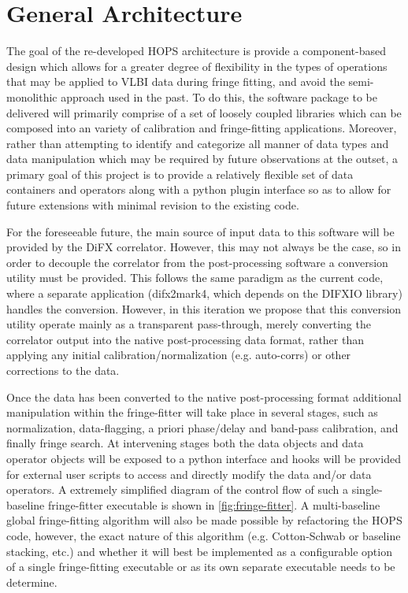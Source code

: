 
\section{General Architecture}
\label{sec:architecture}


The goal of the re-developed HOPS architecture is provide a component-based design which allows for a greater degree of flexibility
in the types of operations that may be applied to VLBI data during fringe fitting, and avoid the semi-monolithic approach used in the past.
To do this, the software package to be delivered will primarily comprise of a set of loosely coupled libraries which can be composed
into an variety of calibration and fringe-fitting applications. Moreover, rather than attempting to identify and categorize all manner of data
types and data manipulation which may be required by future observations at the outset, a primary goal of this project is to provide a
relatively flexible set of data containers and operators along with a python plugin interface so as to allow for future extensions with minimal revision to the existing code.

For the foreseeable future, the main source of input data to this software will be provided by the DiFX correlator. However, this may not always
be the case, so in order to decouple the correlator from the post-processing software a conversion utility must be provided. This follows
the same paradigm as the current code, where a separate application (difx2mark4, which depends on the DIFXIO library) handles the conversion. However,
in this iteration we propose that this conversion utility operate mainly as a transparent pass-through, merely
converting the correlator output into the native post-processing data format, rather than applying any initial calibration/normalization (e.g. auto-corrs) or
other corrections to the data.

Once the data has been converted to the native post-processing format additional manipulation within the fringe-fitter will take place in several stages, such as normalization, data-flagging, a priori phase/delay and band-pass calibration, and finally fringe search. At intervening stages
both the data objects and data operator objects will be exposed to a python interface and hooks will be provided for external user scripts to 
access and directly modify the data and/or data operators. A extremely simplified diagram of the control flow of such a single-baseline fringe-fitter executable is shown in \ref{fig:fringe-fitter}. A multi-baseline global fringe-fitting algorithm will also be made possible by refactoring the HOPS code, however, the exact nature of this algorithm (e.g. Cotton-Schwab or baseline stacking, etc.) and whether it will best be implemented as a configurable option of a single fringe-fitting executable or as its own separate executable needs to be determine.

